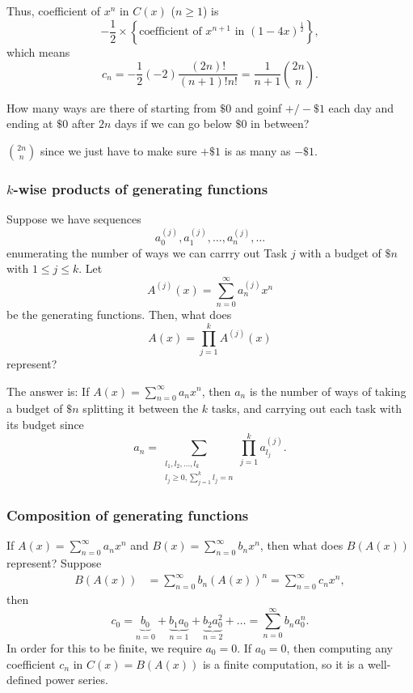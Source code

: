Thus, coefficient of \(x^n\) in \(C(x)\) (\(n \ge 1\)) is 
\[
    -\frac{1}{2} \times \left\{ \text{coefficient of } x^{n+1} \text{ in } (1 - 4x)^{\frac{1}{2}}   \right\}, 
\] which means 
\[
    c_n = -\frac{1}{2} (-2) \frac{(2n)!}{(n+1)!n!} = \frac{1}{n+1} \binom{2n}{n}.
\]


\begin{question}
    How many ways are there of starting from \(\$ 0\) and goinf \(+ / - \$ 1\) each day and ending at \(\$ 0\) after \(2n\) days if we can go below \(\$ 0\) in between?    
\end{question}
\begin{answer}
    \(\binom{2n}{n}\) since we just have to make sure \(+\$ 1\) is as many as \(-\$ 1\).   
\end{answer}

\subsubsection{\(k\)-wise products of generating functions}
Suppose we have sequences 
\[
    a_0^{(j)}, a_1^{(j)}, \dots , a_n^{(j)}, \dots 
\] enumerating the number of ways we can carrry out Task \(j\) with a budget of \(\$ n\) with \(1 \le j \le k\). Let 
\[
    A^{(j)}(x) = \sum_{n=0}^{\infty} a_n^{(j)} x^n 
\] be the generating functions. Then, what does 
\[
    A(x) = \prod _{j=1}^k A^{(j)}(x)
\] represent?

The answer is: If \(A(x) = \sum_{n=0}^{\infty} a_n x^n  \), then \(a_n\) is the number of ways of taking a budget of \(\$ n\) splitting it between the \(k\) tasks, and carrying out each task with its budget since 
\[
    a_n = \sum_{\substack{l_1, l_2, \dots , l_k \\ l_j \ge 0, \sum_{j=1}^k l_j = n }} \prod _{j=1}^k a_{l_j}^{(j)}. 
\]    

\subsubsection{Composition of generating functions}
If \(A(x) = \sum_{n=0}^{\infty} a_n x^n \) and \(B(x) = \sum_{n=0}^{\infty} b_n x^n \), then what does \(B(A(x))\) represent?
Suppose
\begin{align*}
    B(A(x)) &= \sum_{n=0}^{\infty} b_n \left( A(x) \right)^n = \sum_{n=0}^{\infty} c_n x^n,   
\end{align*}   
then 
\[
    c_0 = \underbrace{b_0}_{n=0} + \underbrace{b_1 a_0}_{n=1} + \underbrace{b_2 a_0^2}_{n=2} + \dots = \sum_{n=0}^{\infty} b_n a_0^n. 
\]
In order for this to be finite, we require \(a_0 = 0\). If \(a_0 = 0\), then computing any coefficient \(c_n\) in \(C(x) = B(A(x))\) is a finite computation, so it is a well-defined power series.

